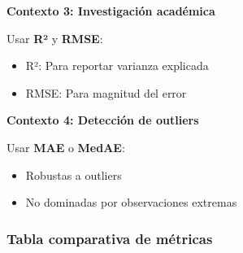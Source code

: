 \documentclass[
  doc,
  floatsintext,
  longtable,
  a4paper,
  nolmodern,
  notxfonts,
  notimes,
  12pt,
  colorlinks=true,linkcolor=blue,citecolor=blue,urlcolor=blue]{apa7}
\providecommand{\tightlist}{%
  \setlength{\itemsep}{0pt}\setlength{\parskip}{0pt}}
\begin{document}
\textbf{Contexto 3: Investigación académica}

Usar \textbf{R²} y \textbf{RMSE}:

\begin{itemize}
\tightlist
\item
  R²: Para reportar varianza explicada
\item
  RMSE: Para magnitud del error
\end{itemize}

\textbf{Contexto 4: Detección de outliers}

Usar \textbf{MAE} o \textbf{MedAE}:

\begin{itemize}
\tightlist
\item
  Robustas a outliers
\item
  No dominadas por observaciones extremas
\end{itemize}

\subsubsection{Tabla comparativa de
métricas}\label{tabla-comparativa-de-muxe9tricas}
\end{document}
